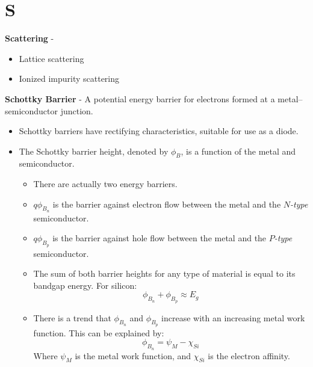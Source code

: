 \section{S}
    \textbf{Scattering} - 
    \vspace{0.15cm}
    \begin{itemize}
        \setlength\itemsep{0.5em}
        \item{Lattice scattering}
        \item{Ionized impurity scattering}
    \end{itemize}
\vspace{0.5cm}
    \textbf{Schottky Barrier} - A potential energy barrier for electrons formed at a metal–semiconductor junction.
    \vspace{0.15cm}
    \begin{itemize}
        \setlength\itemsep{0.5em}
        \item{Schottky barriers have rectifying characteristics, suitable for use as a diode.}
        \item{The Schottky barrier height, denoted by $\phi_B$, is a function of the metal and semiconductor.}
        \begin{itemize}
            \setlength\itemsep{0.5em}
            \item{There are actually two energy barriers.}
            \item{$q\phi_{B_n}$ is the barrier against electron flow between the metal and the $N$\emph{-type} semiconductor.}
            \item{$q\phi_{B_p}$ is the barrier against hole flow between the metal and the $P$\emph{-type} semiconductor.}
            \item{The sum of both barrier heights for any type of material is equal to its bandgap energy.  For silicon:}
            \begin{equation}
                \phi_{B_n} + \phi_{B_p} \approx E_g
            \end{equation}
            \item{There is a trend that $\phi_{B_n}$ and $\phi_{B_p}$ increase with an increasing metal work function.  This can be explained by:}
                \begin{equation}
                    \phi_{B_n} = \psi_M - \chi_{Si}
                \end{equation}
                Where $\psi_M$ is the metal work function, and $\chi_{Si}$ is the electron affinity.
        \end{itemize}
    \end{itemize}
